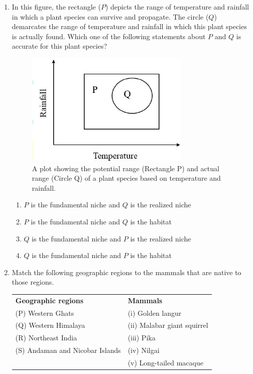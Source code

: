 \documentclass[journal]{IEEEtran}
\begin{document}
\begin{enumerate}
    \item In this figure, the rectangle ($P$) depicts the range of temperature and rainfall in which a plant species can survive and propagate.
The circle ($Q$) demarcates the range of temperature and rainfall in which this plant species is actually found.
Which one of the following statements about $P$ and $Q$ is accurate for this plant species?
\clearpage
\begin{figure}[!h]
        \centering
        \includegraphics[width=0.5\columnwidth]{figs/Q.27.png}
        \caption{A plot showing the potential range (Rectangle P) and actual range (Circle Q) of a plant species based on temperature and rainfall.}
        \label{fig:Q.27}
    \end{figure}
    \begin{enumerate}
        \item $P$ is the fundamental niche and $Q$ is the realized niche
        \item $P$ is the fundamental niche and $Q$ is the habitat
        \item $Q$ is the fundamental niche and $P$ is the realized niche
        \item $Q$ is the fundamental niche and $P$ is the habitat
  
  \end{enumerate}
    
    \item Match the following geographic regions to the mammals that are native to those regions.
\begin{center}
    \begin{tabular}{ll}
        \textbf{Geographic regions} & \textbf{Mammals} \\
        (P) Western Ghats & (i) Golden langur \\
        (Q) Western Himalaya & (ii) Malabar giant squirrel \\
        (R) Northeast India & (iii) Pika \\
        (S) Andaman and Nicobar Islands & (iv) Nilgai \\
        & (v) Long-tailed macaque
    \end{tabular}
    \end{center}
    

\end{enumerate}
\end{document}
